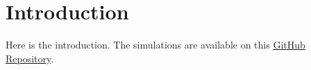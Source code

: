 \section{Introduction}

Here is the introduction. 
The simulations are available on this  \href{https://github.com/gregoirebechade/covid_internship}{GitHub Repository}\label{github-link}.
